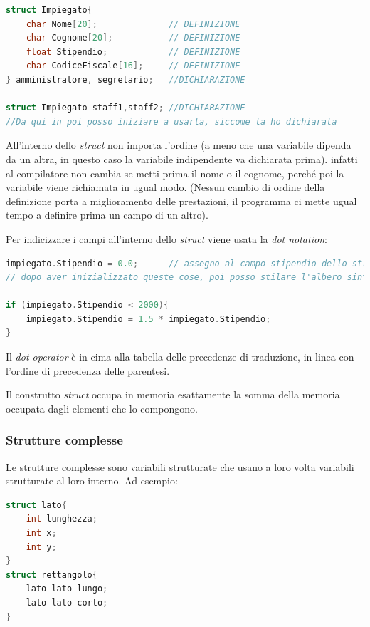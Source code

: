 \documentclass[
  paper=a4,
  oneside  ,captions=tableheading
]{scrbook}
\begin{document}
\begin{lstlisting}[language=C]
struct Impiegato{
    char Nome[20];              // DEFINIZIONE
    char Cognome[20];           // DEFINIZIONE
    float Stipendio;            // DEFINIZIONE
    char CodiceFiscale[16];     // DEFINIZIONE
} amministratore, segretario;   //DICHIARAZIONE

struct Impiegato staff1,staff2; //DICHIARAZIONE 
//Da qui in poi posso iniziare a usarla, siccome la ho dichiarata
\end{lstlisting}

All'interno dello \emph{struct} non importa l'ordine (a meno che una
variabile dipenda da un altra, in questo caso la variabile indipendente
va dichiarata prima). infatti al compilatore non cambia se metti prima
il nome o il cognome, perché poi la variabile viene richiamata in ugual
modo. (Nessun cambio di ordine della definizione porta a miglioramento
delle prestazioni, il programma ci mette ugual tempo a definire prima un
campo di un altro).

Per indicizzare i campi all'interno dello \emph{struct} viene usata la
\emph{dot notation}:

\begin{lstlisting}[language=C]
impiegato.Stipendio = 0.0;      // assegno al campo stipendio dello struct impiegato uguale a zero
// dopo aver inizializzato queste cose, poi posso stilare l'albero sintattico per usare lo struct come variabile normale:

if (impiegato.Stipendio < 2000){
    impiegato.Stipendio = 1.5 * impiegato.Stipendio;
}
\end{lstlisting}

Il \emph{dot operator} è in cima alla tabella delle precedenze di
traduzione, in linea con l'ordine di precedenza delle parentesi.

Il construtto \emph{struct} occupa in memoria esattamente la somma della
memoria occupata dagli elementi che lo compongono.

\hypertarget{strutture-complesse}{%
\subsubsection{Strutture complesse}\label{strutture-complesse}}

Le strutture complesse sono variabili strutturate che usano a loro volta
variabili strutturate al loro interno. Ad esempio:

\begin{lstlisting}[language=C]
struct lato{
    int lunghezza;
    int x;
    int y;
}
struct rettangolo{
    lato lato-lungo;
    lato lato-corto;
}
\end{lstlisting}
\end{document}
